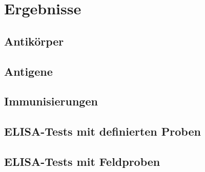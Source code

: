 \section{Ergebnisse}

\subsection{Antikörper}

\blindtext

\subsection{Antigene}

\blindtext

\subsection{Immunisierungen}

\blindtext

\subsection{ELISA-Tests mit definierten Proben}

\subsection{ELISA-Tests mit Feldproben}

\blindtext
